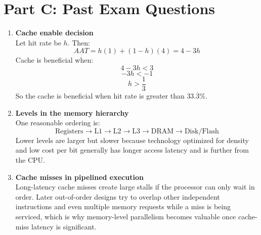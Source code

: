 \documentclass[11pt]{article}
\begin{document}
\section*{Part C: Past Exam Questions}
\begin{enumerate}[label=\textbf{C\arabic*.}]
  \item \textbf{Cache enable decision}
  \\[0.5ex]
  Let hit rate be \(h\). Then:
  \[
    AAT = h(1) + (1-h)(4) = 4 - 3h
  \]
  Cache is beneficial when:
  \[
    4 - 3h < 3
  \]
  \[
    -3h < -1
  \]
  \[
    h > \frac{1}{3}
  \]
  So the cache is beneficial when hit rate is greater than \(33.\overline{3}\%\).

  \item \textbf{Levels in the memory hierarchy}
  \\[0.5ex]
  One reasonable ordering is:
  \[
    \text{Registers} \rightarrow \text{L1} \rightarrow \text{L2} \rightarrow \text{L3} \rightarrow \text{DRAM} \rightarrow \text{Disk/Flash}
  \]
  Lower levels are larger but slower because technology optimized for density and low cost per bit generally has longer access latency and is further from the CPU.

  \item \textbf{Cache misses in pipelined execution}
  \\[0.5ex]
  Long-latency cache misses create large stalls if the processor can only wait in order. Later out-of-order designs try to overlap other independent instructions and even multiple memory requests while a miss is being serviced, which is why memory-level parallelism becomes valuable once cache-miss latency is significant.
\end{enumerate}
\end{document}

